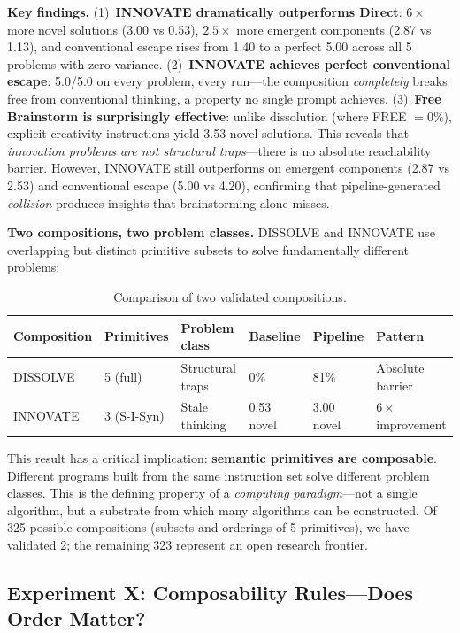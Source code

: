 \documentclass[11pt,a4paper]{article}
\begin{document}
\textbf{Key findings.} (1)~\textbf{INNOVATE dramatically outperforms Direct}: $6\times$ more novel solutions (3.00 vs 0.53), $2.5\times$ more emergent components (2.87 vs 1.13), and conventional escape rises from 1.40 to a perfect 5.00 across all 5 problems with zero variance. (2)~\textbf{INNOVATE achieves perfect conventional escape}: 5.0/5.0 on every problem, every run---the composition \emph{completely} breaks free from conventional thinking, a property no single prompt achieves. (3)~\textbf{Free Brainstorm is surprisingly effective}: unlike dissolution (where FREE $= 0\%$), explicit creativity instructions yield 3.53 novel solutions. This reveals that \emph{innovation problems are not structural traps}---there is no absolute reachability barrier. However, INNOVATE still outperforms on emergent components (2.87 vs 2.53) and conventional escape (5.00 vs 4.20), confirming that pipeline-generated \emph{collision} produces insights that brainstorming alone misses.

\textbf{Two compositions, two problem classes.} DISSOLVE and INNOVATE use overlapping but distinct primitive subsets to solve fundamentally different problems:

\begin{table}[H]
\centering
\caption{Comparison of two validated compositions.}
\small
\begin{tabular}{llllll}
\toprule
\textbf{Composition} & \textbf{Primitives} & \textbf{Problem class} & \textbf{Baseline} & \textbf{Pipeline} & \textbf{Pattern} \\
\midrule
DISSOLVE & 5 (full) & Structural traps   & 0\%       & 81\%     & Absolute barrier \\
INNOVATE & 3 (S-I-Syn) & Stale thinking  & 0.53 novel & 3.00 novel & $6\times$ improvement \\
\bottomrule
\end{tabular}
\label{tab:two-compositions}
\end{table}

This result has a critical implication: \textbf{semantic primitives are composable}. Different programs built from the same instruction set solve different problem classes. This is the defining property of a \emph{computing paradigm}---not a single algorithm, but a substrate from which many algorithms can be constructed. Of 325 possible compositions (subsets and orderings of 5 primitives), we have validated 2; the remaining 323 represent an open research frontier.

\subsection{Experiment X: Composability Rules---Does Order Matter?}
\label{sec:composability-rules}
\end{document}
